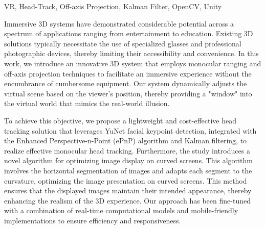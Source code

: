
\begin{英文摘要}{VR, Head-Track, Off-axis Projection, Kalman Filter, OpenCV, Unity}


Immersive 3D systems have demonstrated considerable potential across a spectrum of applications ranging from entertainment to education. Existing 3D solutions typically necessitate the use of specialized glasses and professional photographic devices, thereby limiting their accessibility and convenience. In this work, we introduce an innovative 3D system that employs monocular ranging and off-axis projection techniques to facilitate an immersive experience without the encumbrance of cumbersome equipment. Our system dynamically adjusts the virtual scene based on the viewer's position, thereby providing a "window" into the virtual world that mimics the real-world illusion.

To achieve this objective, we propose a lightweight and cost-effective head tracking solution that leverages YuNet facial keypoint detection, integrated with the Enhanced Perspective-n-Point (ePnP) algorithm and Kalman filtering, to realize effective monocular head tracking. Furthermore, the study introduces a novel algorithm for optimizing image display on curved screens. This algorithm involves the horizontal segmentation of images and adapts each segment to the curvature, optimizing the image presentation on curved screens. This method ensures that the displayed images maintain their intended appearance, thereby enhancing the realism of the 3D experience. Our approach has been fine-tuned with a combination of real-time computational models and mobile-friendly implementations to ensure efficiency and responsiveness.

\end{英文摘要}

